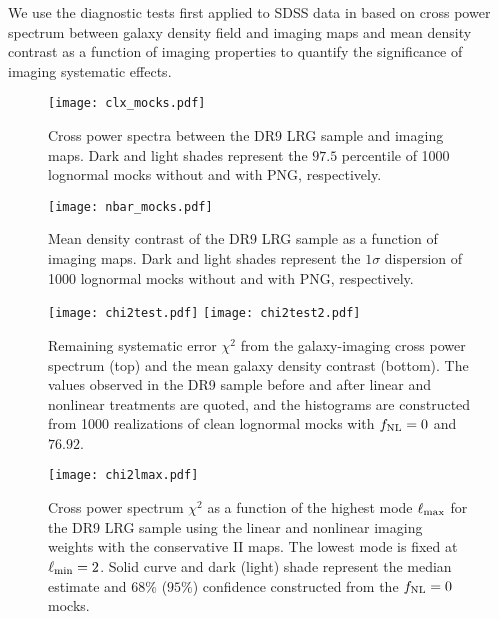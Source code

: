 We use the diagnostic tests first applied to SDSS data in \cite{rezaie2021primordial} based on cross power spectrum between galaxy density field and imaging maps and mean density contrast as a function of imaging properties to quantify the significance of imaging systematic effects. 

\begin{figure*}
\centering
\texttt{[image: clx\_mocks.pdf]}
\caption{Cross power spectra between the DR9 LRG sample and imaging maps. Dark and light shades represent the $97.5$ percentile of 1000 lognormal mocks without and with PNG, respectively.}\label{fig:clxmock}
\end{figure*}

\begin{figure*}
\centering
\texttt{[image: nbar\_mocks.pdf]}
\caption{Mean density contrast of the DR9 LRG sample as a function of imaging maps. Dark and light shades represent the $1\sigma$ dispersion of 1000 lognormal mocks without and with PNG, respectively.}\label{fig:nbarmock}
\end{figure*}


\begin{figure}
\raggedleft
\texttt{[image: chi2test.pdf]}
\texttt{[image: chi2test2.pdf]}
\caption{Remaining systematic error $\chi^{2}$ from the galaxy-imaging cross power spectrum (top) and the mean galaxy density contrast (bottom). The values observed in the DR9 sample before and after linear and nonlinear treatments are quoted, and the histograms are constructed from 1000 realizations of clean lognormal mocks with $f_{\rm NL}=0$ and $76.92$.}\label{fig:chi2test}
\end{figure}

\begin{figure}
\centering
\texttt{[image: chi2lmax.pdf]}
\caption{Cross power spectrum $\chi^{2}$ as a function of the highest mode $\ell_{\rm max}$ for the DR9 LRG sample using the linear and nonlinear imaging weights with the conservative II maps. The lowest mode is fixed at $\ell_{\rm min}=2$. Solid curve and dark (light) shade represent the median estimate and $68\%$ ($95\%$) confidence constructed from the $f_{\rm NL}=0$ mocks.}\label{fig:chi2cellextend}
\end{figure}


